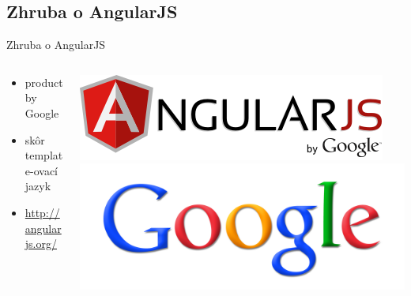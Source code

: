 \subsection{Zhruba o AngularJS}
\begin{frame}{Zhruba o AngularJS}
	\begin{columns}[T]
		\begin{column}{.5\textwidth}
			\begin{itemize}
				\item product by Google
				\item skôr template-ovací jazyk
				\item \url{http://angularjs.org/}
			\end{itemize}
		\end{column}
		\begin{column}{.5\textwidth}
			\includegraphics[scale=0.3]{images/angular-logo.png}\\
			\includegraphics[scale=0.05]{images/google.png}
		\end{column}
	\end{columns}
\end{frame}

